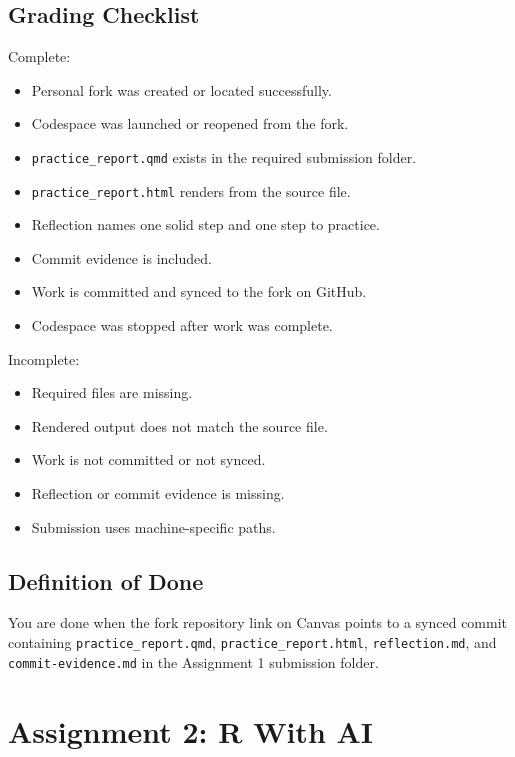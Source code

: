 \documentclass[
  letterpaper,
  DIV=11,
  numbers=noendperiod,
  oneside]{scrreprt}
\providecommand{\tightlist}{%
  \setlength{\itemsep}{0pt}\setlength{\parskip}{0pt}}
\begin{document}
\section{Grading Checklist}\label{grading-checklist}

Complete:

\begin{itemize}
\tightlist
\item
  Personal fork was created or located successfully.
\item
  Codespace was launched or reopened from the fork.
\item
  \texttt{practice\_report.qmd} exists in the required submission
  folder.
\item
  \texttt{practice\_report.html} renders from the source file.
\item
  Reflection names one solid step and one step to practice.
\item
  Commit evidence is included.
\item
  Work is committed and synced to the fork on GitHub.
\item
  Codespace was stopped after work was complete.
\end{itemize}

Incomplete:

\begin{itemize}
\tightlist
\item
  Required files are missing.
\item
  Rendered output does not match the source file.
\item
  Work is not committed or not synced.
\item
  Reflection or commit evidence is missing.
\item
  Submission uses machine-specific paths.
\end{itemize}

\section{Definition of Done}\label{definition-of-done-10}

You are done when the fork repository link on Canvas points to a synced
commit containing \texttt{practice\_report.qmd},
\texttt{practice\_report.html}, \texttt{reflection.md}, and
\texttt{commit-evidence.md} in the Assignment 1 submission folder.

\chapter{Assignment 2: R With AI}\label{assignment-2-r-with-ai}
\end{document}
